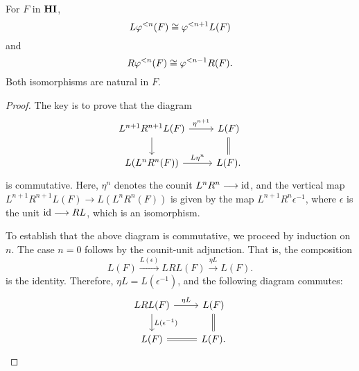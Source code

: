 \begin{prop}\label{prop_tl_L_R}
For $F$ in $\mathbf{HI}$, 
\[
L \varphi^{< n}(F) \cong \varphi^{< n + 1} L(F)
\]
and
\[
R\varphi^{< n}(F) \cong \varphi^{< n - 1}R(F).
\] 
Both isomorphisms are natural in $F$.
\end{prop}
\begin{proof}
The key is to prove that the diagram
\begin{equation}\label{eq_Ltl_com_diag}
\begin{tikzcd}
L^{n + 1}R^{n + 1}L(F) \arrow{r}{\eta^{n + 1}} \arrow{d} &
L(F) \arrow[equals]{d} \\
L(L^{n}R^n(F)) \arrow{r}{L\eta^{n}} &
L(F).
\end{tikzcd}
\end{equation}
is commutative. Here, $\eta^n$ denotes the counit $L^nR^n \longrightarrow \mathrm{id}$,
and the vertical map $L^{n + 1}R^{n + 1}L(F) \to L(L^nR^n (F))$ is 
given by the map $L^{n + 1}R^n \epsilon^{-1}$, where $\epsilon$ is
the unit $\mathrm{id} \longrightarrow RL$, which is an isomorphism.

To establish that the above diagram is commutative, we proceed by 
induction on $n$. The case $n = 0$ follows by the counit-unit 
adjunction. That is, the composition
\[
L(F) \stackrel{L(\epsilon)}{\to} LRL(F) \stackrel{\eta L}{\to} 
   L(F).
\]
is the identity. Therefore, $\eta L = L(\epsilon^{-1})$, and the
following diagram commutes:
\[
\begin{tikzcd}
LRL(F) \arrow{r}{\eta L} \arrow{d}{L(\epsilon^{-1})} &
L(F) \arrow[equals]{d} \\
L(F) \arrow[equals]{r} & L(F).
\end{tikzcd}
\]


\end{proof}
